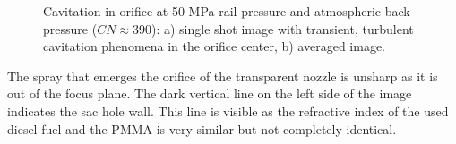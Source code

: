 \documentclass[letterpaper,twocolumn,10pt]{ilass}
\begin{document}
\begin{figure}[h]
\begin{center}
\end{center}
\vspace*{-10mm}
\caption{Cavitation in orifice at 50 MPa rail pressure and atmospheric back pressure
         ($CN \approx 390$): a) single shot image with transient, turbulent cavitation
				 phenomena in the orifice center, b) averaged image.}
\label{fig4} 
\end{figure}


The spray that emerges the orifice of the transparent nozzle is unsharp as it is out of the
focus plane. The dark vertical line on the left side of the image indicates the sac hole wall.
This line is visible as the refractive index of the used diesel fuel and the PMMA is very
similar but not completely identical.\\
\end{document}
